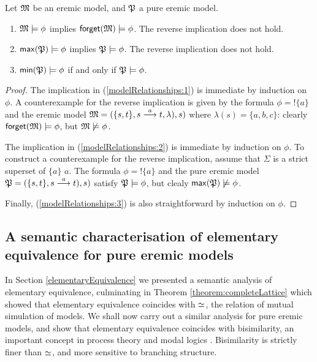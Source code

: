 \begin{lemma}\label{modelRelationships}
Let $\frak{M}$ be an eremic model, and $\frak{P}$ a pure eremic model.
\begin{enumerate}

\item\label{modelRelationships:1}  $\frak{M} \models \phi$ implies
  $\mathsf{forget}(\frak{M}) \models \phi$. The reverse implication does not hold.

\item\label{modelRelationships:2}  $ \mathsf{max}(\frak{P}) \models \phi$ implies
  $\frak{P} \models \phi$. The reverse implication does not hold.

\item\label{modelRelationships:3} $\mathsf{min}(\frak{P}) \models \phi$ if and only if
  $\frak{P} \models \phi$. 

\end{enumerate}
\end{lemma}

\begin{proof}
The implication in (\ref{modelRelationships:1}) is immediate by
induction on $\phi$. A counterexample for the reverse implication is
given by the formula $\phi = !\{a\}$ and the eremic model $\frak{M} = ( \{s,
t\}, s \stackrel{a}{\longrightarrow} t, \lambda), s)$ where $\lambda (s) = \{a, b, c\}$:
clearly $\mathsf{forget}(\frak{M}) \models \phi$, but $\frak{M} \not\models
\phi$.

The implication in (\ref{modelRelationships:2}) is immediate by
induction on $\phi$. To construct a counterexample for the reverse
implication, assume that $\Sigma$ is a strict superset of $\{a\}$
$a$. The formula $\phi = !\{a\}$ and the pure eremic model $\frak{P} = (
\{s, t\}, s \stackrel{a}{\longrightarrow} t ), s)$ satisfy $\frak{P} \models \phi$, but clealy
$\mathsf{max}(\frak{P}) \not\models \phi$.

Finally, (\ref{modelRelationships:3}) is also straightforward by
induction on $\phi$.

\end{proof}


\subsection{A semantic characterisation of elementary equivalence for pure eremic models}

In Section \ref{elementaryEquivalence} we presented a semantic
analysis of elementary equivalence, culminating in Theorem
\ref{theorem:completeLattice} which showed that elementary equivalence
coincides with $\simeq$, the relation of mutual simulation of
models. We shall now carry out a similar analysis for pure eremic
models, and show that elementary equivalence coincides with
bisimilarity, an important concept in process theory and modal logics
\cite{SangiorgiD:intbisac}. Bisimilarity is strictly finer than
$\simeq$, and more sensitive to branching structure.

